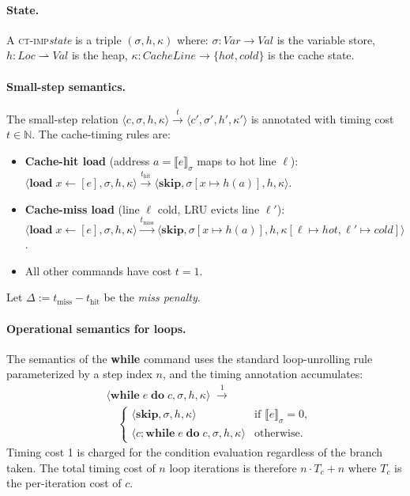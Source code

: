 \documentclass[acmsmall,sigplan,anonymous,review,screen]{acmart}
\theoremstyle{plain}
\theoremstyle{definition}
\newcommand{\CTIMP}{\textsc{ct-imp}\xspace}
\begin{document}
\paragraph{State.}
A \CTIMP \emph{state} is a triple $(\sigma, h, \kappa)$ where:
$\sigma : \mathit{Var} \to \mathit{Val}$ is the variable store,
$h : \mathit{Loc} \rightharpoonup \mathit{Val}$ is the heap,
$\kappa : \mathit{CacheLine} \to \{\mathit{hot}, \mathit{cold}\}$ is the
cache state.

\paragraph{Small-step semantics.}
The small-step relation $\langle c, \sigma, h, \kappa \rangle
\xrightarrow{t} \langle c', \sigma', h', \kappa' \rangle$ is annotated
with timing cost $t \in \mathbb{N}$.  The cache-timing rules are:
\begin{itemize}[itemsep=2pt]
  \item \textbf{Cache-hit load} (address $a = \llbracket e \rrbracket_\sigma$ maps to hot line
    $\ell$):
    $\langle \mathbf{load}\; x \leftarrow [e], \sigma, h, \kappa \rangle
    \xrightarrow{t_{\mathrm{hit}}}
    \langle \mathbf{skip}, \sigma[x \mapsto h(a)], h, \kappa \rangle$.
  \item \textbf{Cache-miss load} (line $\ell$ cold, LRU evicts line $\ell'$):
    $\langle \mathbf{load}\; x \leftarrow [e], \sigma, h, \kappa \rangle
    \xrightarrow{t_{\mathrm{miss}}}
    \langle \mathbf{skip}, \sigma[x \mapsto h(a)], h, \kappa[\ell \mapsto \mathit{hot}, \ell' \mapsto \mathit{cold}] \rangle$.
  \item All other commands have cost $t = 1$.
\end{itemize}

Let $\Delta := t_{\mathrm{miss}} - t_{\mathrm{hit}}$ be the \emph{miss penalty}.

\paragraph{Operational semantics for loops.}
The semantics of the \textbf{while} command uses the standard loop-unrolling
rule parameterized by a step index $n$, and the timing annotation accumulates:
\begin{align*}
  &\langle \mathbf{while}\; e\; \mathbf{do}\; c, \sigma, h, \kappa \rangle
  \;\xrightarrow{1}\; \\
  &\quad\begin{cases}
    \langle \mathbf{skip}, \sigma, h, \kappa \rangle
    & \text{if } \llbracket e \rrbracket_\sigma = 0, \\
    \langle c ; \mathbf{while}\; e\; \mathbf{do}\; c, \sigma, h, \kappa \rangle
    & \text{otherwise.}
  \end{cases}
\end{align*}
Timing cost 1 is charged for the condition evaluation regardless of the
branch taken.  The total timing cost of $n$ loop iterations is therefore
$n \cdot T_c + n$ where $T_c$ is the per-iteration cost of $c$.
\end{document}

